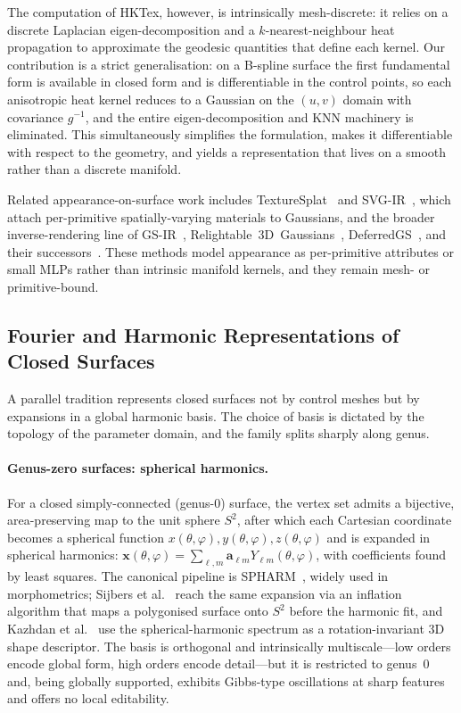 The computation of HKTex, however, is intrinsically mesh-discrete: it relies
on a discrete Laplacian eigen-decomposition and a $k$-nearest-neighbour heat
propagation to approximate the geodesic quantities that define each kernel.
Our contribution is a strict generalisation: on a B-spline surface the first
fundamental form is available in closed form and is differentiable in the
control points, so each anisotropic heat kernel reduces to a Gaussian on the
$(u,v)$ domain with covariance $g^{-1}$, and the entire eigen-decomposition
and KNN machinery is eliminated. This simultaneously simplifies the
formulation, makes it differentiable with respect to the geometry, and yields
a representation that lives on a smooth rather than a discrete manifold.

Related appearance-on-surface work includes TextureSplat~\cite{texturesplat}
and SVG-IR~\cite{svgir}, which attach per-primitive spatially-varying
materials to Gaussians, and the broader inverse-rendering line of
GS-IR~\cite{gsir}, Relightable~3D~Gaussians~\cite{relightable3dgaussians},
DeferredGS~\cite{deferredgs}, and their successors~\cite{gigs,gusir,rtrgs}.
These methods model appearance as per-primitive attributes or small MLPs
rather than intrinsic manifold kernels, and they remain mesh- or
primitive-bound.

\subsection{Fourier and Harmonic Representations of Closed Surfaces}\label{sec:rw:fourier}

A parallel tradition represents closed surfaces not by control meshes
but by expansions in a global harmonic basis. The choice of basis is
dictated by the topology of the parameter domain, and the family splits
sharply along genus.

\paragraph{Genus-zero surfaces: spherical harmonics.}
For a closed simply-connected (genus-0) surface, the vertex set admits a
bijective, area-preserving map to the unit sphere $S^{2}$, after which
each Cartesian coordinate becomes a spherical function
$x(\theta,\varphi),y(\theta,\varphi),z(\theta,\varphi)$ and is expanded
in spherical harmonics:
$\mathbf{x}(\theta,\varphi)=\sum_{\ell,m}\mathbf{a}_{\ell m}Y_{\ell m}(\theta,\varphi)$,
with coefficients found by least squares. The canonical pipeline is
\textsc{SPHARM}~\cite{shen2009spharm}, widely used in morphometrics;
Sijbers et al.~\cite{sijbers2002fd3d} reach the same expansion via an
inflation algorithm that maps a polygonised surface onto $S^{2}$ before
the harmonic fit, and Kazhdan et al.~\cite{kazhdan2003sh} use the
spherical-harmonic spectrum as a rotation-invariant 3D shape
descriptor. The basis is orthogonal and intrinsically multiscale---low
orders encode global form, high orders encode detail---but it is
restricted to genus~0 and, being globally supported, exhibits Gibbs-type
oscillations at sharp features and offers no local editability.

